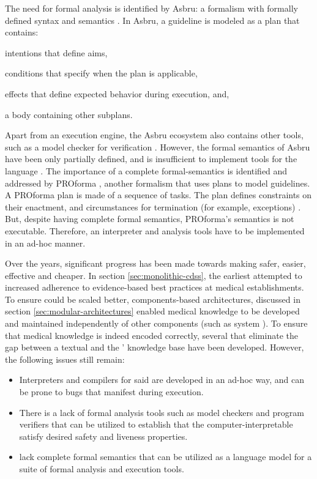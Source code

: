 The need for formal analysis is identified by Asbru: a formalism with formally
defined syntax and semantics \cite{ShaharAMIA96}. In Asbru, a guideline is modeled as a plan
that contains:
\begin{enumerate*}[label=(\roman*)]
  \item intentions that define aims,
  \item conditions that specify when the plan is applicable,
  \item effects that define expected behavior during execution, and,
  \item a body containing other subplans.
\end{enumerate*}
Apart from an execution engine, the Asbru ecosystem also contains
other tools, such as a model checker for verification \cite{BaumlerSPIN06}.
However, the formal semantics of Asbru have been only partially defined, and
is insufficient to implement tools for the language \cite{SuttonAMIA03}.
The importance of a complete formal-semantics is identified and addressed
by PROforma \cite{SuttonAMIA03}, another formalism that uses plans to
model guidelines. A PROforma plan is made of a sequence of tasks.
The plan defines constraints on their enactment, and circumstances
for termination (for example, exceptions) \cite{SuttonAMIA03}. But, despite
having complete formal semantics, PROforma's semantics is not executable.
Therefore, an interpreter and analysis tools have to be implemented in an
ad-hoc manner.

Over the years, significant progress has been made towards making \CDSSs{}
safer, easier, effective and cheaper. In section \ref{sec:monolithic-cdss},
the earliest \CDSSs{} attempted to increased adherence to evidence-based best practices
at medical establishments. To ensure \CDSSs{} could be scaled better,
components-based architectures, discussed in section
\ref{sec:modular-architectures} enabled medical knowledge to
be developed and maintained independently of other components (such as system
\UI{}). To ensure that medical knowledge is indeed encoded correctly,
several \DSLs{} that eliminate the gap between a textual \BPG{} and
the \CDSS{}' knowledge base have been developed. However,
the following issues still remain:
\begin{itemize}
  \item Interpreters and compilers for said \DSLs{} are developed in an
    ad-hoc way, and can be prone to bugs that manifest during execution.
  \item There is a lack of formal analysis tools such as model checkers and
    program verifiers that can be utilized to establish that the
    computer-interpretable \BPGs{} satisfy desired safety and liveness
    properties.
  \item \DSLs{} lack complete formal semantics that can be utilized
    as a language model for a suite of formal analysis and execution tools.
\end{itemize}

